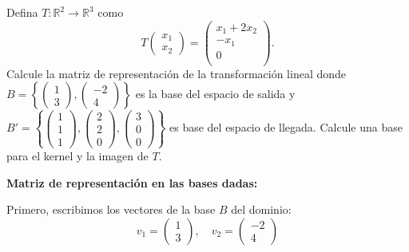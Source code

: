 \begin{prob}
Defina $T: \mathbb{R}^2 \rightarrow \mathbb{R}^3$ como
\[
T\begin{pmatrix}
 x_1\\x_2
\end{pmatrix}=\begin{pmatrix}
x_1+2x_2 \\
	-x_1 \\
	0\\
\end{pmatrix}.
\]
Calcule la matriz de representación de la transformación lineal donde $B=\left\lbrace \begin{pmatrix} 1 \\ 3 \end{pmatrix}, \begin{pmatrix} -2 \\ 4 \end{pmatrix} \right\rbrace$ es la base del espacio de salida y $B'=\left\lbrace \begin{pmatrix} 1 \\ 1 \\ 1 \end{pmatrix}, \begin{pmatrix} 2 \\ 2 \\ 0 \end{pmatrix}, \begin{pmatrix} 3 \\ 0 \\ 0 \end{pmatrix} \right\rbrace$ es base del espacio de llegada. Calcule una base para el kernel y la imagen de $T$.
\begin{myproof}
\textbf{Matriz de representación en las bases dadas:}

Primero, escribimos los vectores de la base $B$ del dominio:
\[
v_1 = \begin{pmatrix} 1 \\ 3 \end{pmatrix}, \quad v_2 = \begin{pmatrix} -2 \\ 4 \end{pmatrix}
\]


\end{myproof}
\end{prob}
